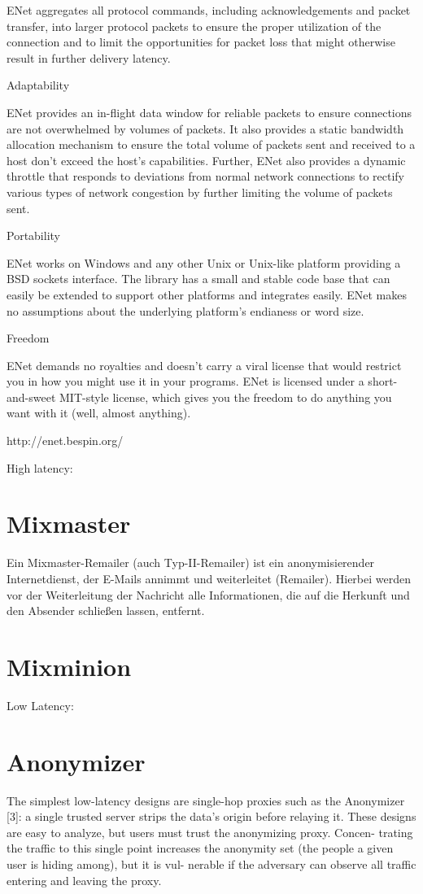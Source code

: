 ENet aggregates all protocol commands, including acknowledgements and packet transfer, into larger protocol packets to ensure the proper utilization of the connection and to limit the opportunities for packet loss that might otherwise result in further delivery latency.

Adaptability

ENet provides an in-flight data window for reliable packets to ensure connections are not overwhelmed by volumes of packets. It also provides a static bandwidth allocation mechanism to ensure the total volume of packets sent and received to a host don't exceed the host's capabilities. Further, ENet also provides a dynamic throttle that responds to deviations from normal network connections to rectify various types of network congestion by further limiting the volume of packets sent.

Portability

ENet works on Windows and any other Unix or Unix-like platform providing a BSD sockets interface. The library has a small and stable code base that can easily be extended to support other platforms and integrates easily. ENet makes no assumptions about the underlying platform's endianess or word size.

Freedom

ENet demands no royalties and doesn't carry a viral license that would restrict you in how you might use it in your programs. ENet is licensed under a short-and-sweet MIT-style license, which gives you the freedom to do anything you want with it (well, almost anything).

http://enet.bespin.org/

High latency:
\section{Mixmaster}
Ein Mixmaster-Remailer (auch Typ-II-Remailer) ist ein anonymisierender Internetdienst, der E-Mails annimmt und weiterleitet (Remailer). Hierbei werden vor der Weiterleitung der Nachricht alle Informationen, die auf die Herkunft und den Absender schließen lassen, entfernt.


\section{Mixminion}

Low Latency:
\section{Anonymizer}
The simplest low-latency designs are single-hop proxies
such as the Anonymizer [3]: a single trusted server strips
the data’s origin before relaying it. These designs are easy to
analyze, but users must trust the anonymizing proxy. Concen-
trating the traffic to this single point increases the anonymity
set (the people a given user is hiding among), but it is vul-
nerable if the adversary can observe all traffic entering and
leaving the proxy.

